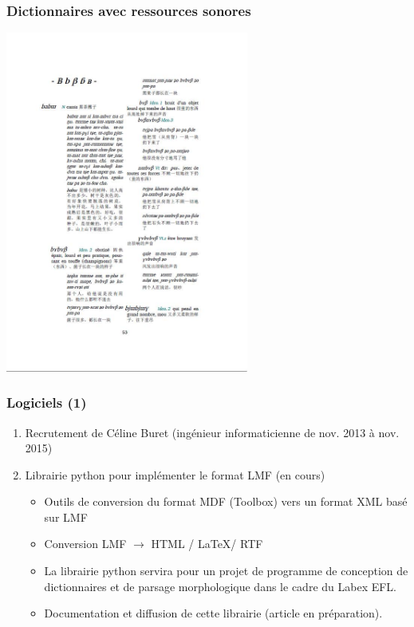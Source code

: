 \documentclass[xcolor=table]{beamer}
\begin{document}
  \begin{frame} 
 \frametitle{Dictionnaires avec ressources sonores}
  \includegraphics[width=0.6\textwidth]{page-japhug.jpg} \centering
 
  \end{frame}    
 
  \begin{frame} 
 \frametitle{Logiciels (1)}
 
\begin{enumerate}[<+->]
\item Recrutement de Céline Buret (ingénieur informaticienne de nov. 2013 à nov. 2015)
\item  Librairie python pour implémenter le format LMF (en cours)
\begin{itemize}
\item Outils de conversion du format MDF (Toolbox) vers un format XML basé sur LMF
\item Conversion LMF $\rightarrow$ HTML / \LaTeX / RTF
\item La librairie python servira pour un projet de programme de conception de dictionnaires et de parsage morphologique dans le cadre du Labex EFL.
\item Documentation et diffusion de cette librairie (article en préparation).
\end{itemize}
\end{enumerate}
  \end{frame}    
  
\end{document}
